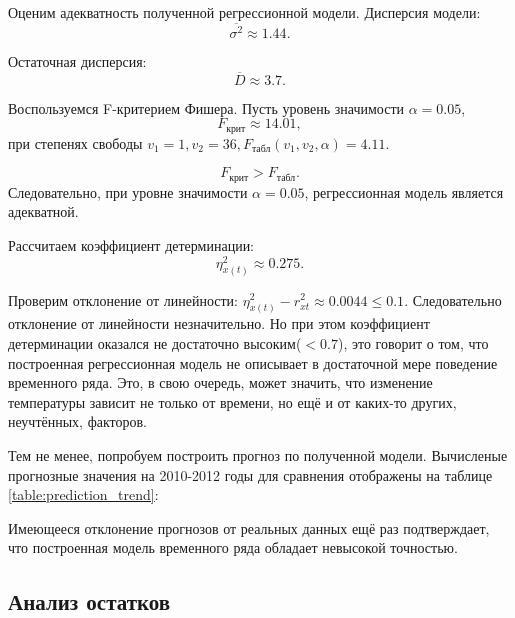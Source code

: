 Оценим адекватность полученной регрессионной модели. Дисперсия модели:
\begin{equation*}
	\overline{\sigma^2} \approx 1.44.
\end{equation*}

Остаточная дисперсия:
\begin{equation*}
	\overline{D} \approx 3.7.
\end{equation*}

Воспользуемся F-критерием Фишера. Пусть уровень значимости $\alpha = 0.05$,
\begin{equation*}
	F_{\textrm{крит}} \approx 14.01,
\end{equation*}
при степенях свободы $v_1 = 1, v_2 = 36, F_{\textrm{табл}}(v_1, v_2, \alpha) = 4.11$.

\begin{equation*}
	F_{\textrm{крит}} > F_{\textrm{табл}}.
\end{equation*}
Следовательно, при уровне значимости $\alpha = 0.05$, регрессионная модель является адекватной.

Рассчитаем коэффициент детерминации:
\begin{equation*}
	\eta_{x(t)}^2 \approx 0.275.
\end{equation*}

Проверим отклонение от линейности: $\eta_{x(t)}^2 - r_{xt}^{2} \approx 0.0044 \le 0.1$. Следовательно отклонение от линейности незначительно. Но при этом коэффициент детерминации оказался не достаточно высоким($<0.7$), это говорит о том, что построенная регрессионная модель не описывает в достаточной мере поведение временного ряда. Это, в свою очередь, может значить, что изменение температуры зависит не только от времени, но ещё и от каких-то других, неучтённых, факторов.

Тем не менее, попробуем построить прогноз по полученной модели. Вычисленые прогнозные значения на 2010-2012 годы для сравнения отображены на таблице \ref{table:prediction_trend}:


Имеющееся отклонение прогнозов от реальных данных ещё раз подтверждает, что построенная модель временного ряда обладает невысокой точностью.


\subsection{Анализ остатков} %
\label{sub:analysis_residuals}

